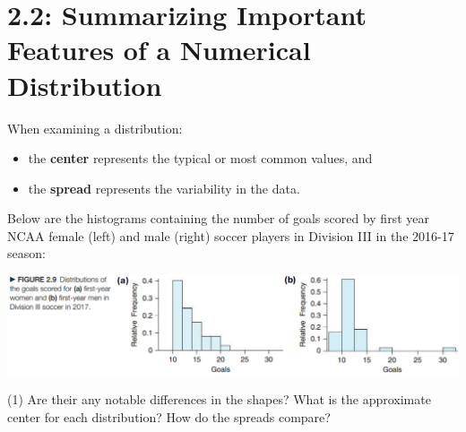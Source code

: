 \documentclass[../mathNotesPreamble]{subfiles}
\begin{document}
  \section{2.2: Summarizing Important Features of a Numerical Distribution}
  \begin{defn*}
    When examining a distribution:
    \begin{itemize}
      \item the \textbf{center} represents the typical or most common values, and
      \item the \textbf{spread} represents the variability in the data.
    \end{itemize}
  \end{defn*}
  \begin{ex*}
    Below are the histograms containing the number of goals scored by first year NCAA female (left) and male (right) soccer players in Division III in the 2016-17 season:
  \end{ex*}
  \begin{center}
    \includegraphics[width=0.975\linewidth]{images/math211_figure_2p09}
  \end{center}
  \begin{tasks}[after-item-skip=\stretch{1}, label=--](1)
    \task Are their any notable differences in the shapes?
    \task What is the approximate center for each distribution?
    \task How do the spreads compare?
  \end{tasks}
  \pagebreak
  
\end{document}
